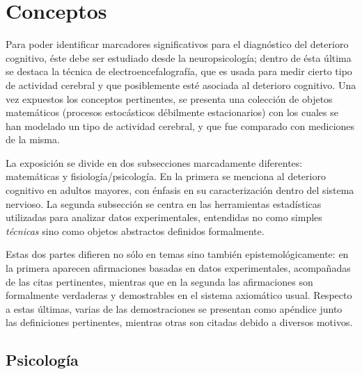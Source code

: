 
\chapter{Conceptos}

Para poder identificar marcadores significativos para el diagnóstico del deterioro cognitivo, 
éste debe ser estudiado desde la neuropsicología; dentro de ésta última se destaca la técnica de 
electroencefalografía, que es usada para medir cierto tipo de actividad cerebral y que 
posiblemente esté asociada al deterioro cognitivo. 
Una vez expuestos los conceptos pertinentes, se presenta una colección de objetos matemáticos
(procesos estocásticos débilmente estacionarios) con los cuales se han modelado un tipo de
actividad cerebral, y que fue comparado con mediciones de la misma.

La exposición se divide en dos subsecciones marcadamente diferentes: matemáticas y 
fisiología/psicología.
En la primera se menciona al deterioro cognitivo en adultos mayores, con énfasis en su 
caracterización dentro del sistema nervioso.
La segunda subsección se centra en las herramientas estadísticas utilizadas para analizar datos 
experimentales, entendidas no como simples \textit{técnicas} sino como objetos abstractos definidos 
formalmente.

Estas dos partes difieren no sólo en temas sino también epistemológicamente: en la primera aparecen 
afirmaciones basadas en datos experimentales, acompañadas de las citas pertinentes, mientras que en 
la segunda las afirmaciones son formalmente verdaderas y demostrables en el sistema axiomático 
usual. Respecto a estas últimas, varias de las demostraciones se presentan como apéndice junto las 
definiciones pertinentes, mientras otras son citadas debido a diversos motivos.

\section{Psicología}

